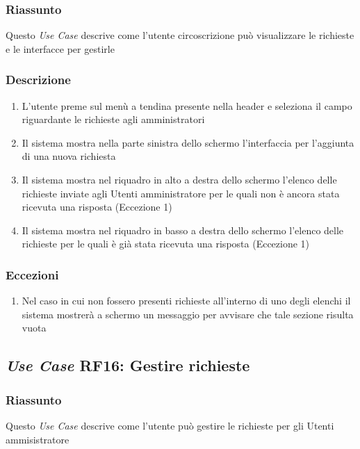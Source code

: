         \subsubsection{Riassunto}
            Questo \textit{Use Case} descrive come l'utente circoscrizione può visualizzare le richieste e le interfacce per gestirle
        \subsubsection{Descrizione}
            \begin{enumerate}
                \item L'utente preme sul menù a tendina presente nella header e seleziona il campo riguardante le richieste agli amministratori
                \item Il sistema mostra nella parte sinistra dello schermo l'interfaccia per l'aggiunta di una nuova richiesta
                \item Il sistema mostra nel riquadro in alto a destra dello schermo l'elenco delle richieste inviate agli Utenti amministratore per le quali non è ancora stata ricevuta una risposta (Eccezione 1)
                \item Il sistema mostra nel riquadro in basso a destra dello schermo l'elenco delle richieste per le quali è già stata ricevuta una risposta (Eccezione 1)
            \end{enumerate}
        \subsubsection{Eccezioni}
            \begin{enumerate}
                \item Nel caso in cui non fossero presenti richieste all'interno di uno degli elenchi il sistema mostrerà a schermo un messaggio per avvisare che tale sezione risulta vuota
            \end{enumerate}

    \subsection{\textit{Use Case} RF16: Gestire richieste}
        \subsubsection{Riassunto}
            Questo \textit{Use Case} descrive come l'utente può gestire le richieste per gli Utenti ammisistratore
